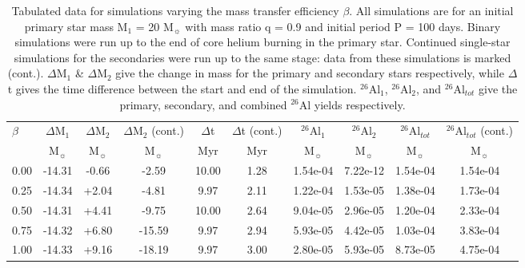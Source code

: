 \begin{table*}
 \caption{Tabulated data for simulations varying the mass transfer efficiency $\beta$.
 All simulations are for an initial primary star mass M$_1$ = 20 M$_{\sun}$ with mass ratio q = 0.9 and initial period P = 100 days.
 Binary simulations were run up to the end of core helium burning in the primary star.
 Continued single-star simulations for the secondaries were run up to the same stage: data from these simulations is marked (cont.).
 $\Delta$M$_1$ \& $\Delta$M$_2$ give the change in mass for the primary and secondary stars respectively, while $\Delta$t gives the time difference between the start and end of the simulation.
 $^{26}$Al$_1$, $^{26}$Al$_2$, and $^{26}$Al$_{tot}$ give the primary, secondary, and combined $^{26}$Al yields respectively.
 }
 \label{tab:data2}
 \begin{tabular}{lccccccccc}
  \hline
  $\beta$ & $\Delta$M$_1$ & $\Delta$M$_2$ & $\Delta$M$_2$ (cont.) & $\Delta$t & $\Delta$t (cont.) & $^{26}$Al$_1$ & $^{26}$Al$_2$ & $^{26}$Al$_{tot}$ & $^{26}$Al$_{tot}$ (cont.) \\
  & M$_{\sun}$ & M$_{\sun}$ & M$_{\sun}$  & Myr & Myr & M$_{\sun}$ & M$_{\sun}$ & M$_{\sun}$ & M$_{\sun}$ \\
  \hline
  0.00 & -14.31 & -0.66 &  -2.59 & 10.00 & 1.28 & 1.54e-04 & 7.22e-12 & 1.54e-04 & 1.54e-04 \\
  0.25 & -14.34 & +2.04 &  -4.81 & 9.97 & 2.11 & 1.22e-04 & 1.53e-05 & 1.38e-04 & 1.73e-04 \\
  0.50 & -14.31 & +4.41 &  -9.75 & 10.00 & 2.64 & 9.04e-05 & 2.96e-05 & 1.20e-04 & 2.33e-04 \\
  0.75 & -14.32 & +6.80 & -15.59 & 9.97 & 2.94 & 5.93e-05 & 4.42e-05 & 1.03e-04 & 3.83e-04 \\
  1.00 & -14.33 & +9.16 & -18.19 & 9.97 & 3.00 & 2.80e-05 & 5.93e-05 & 8.73e-05 & 4.75e-04 \\
  \hline
 \end{tabular}
\end{table*}